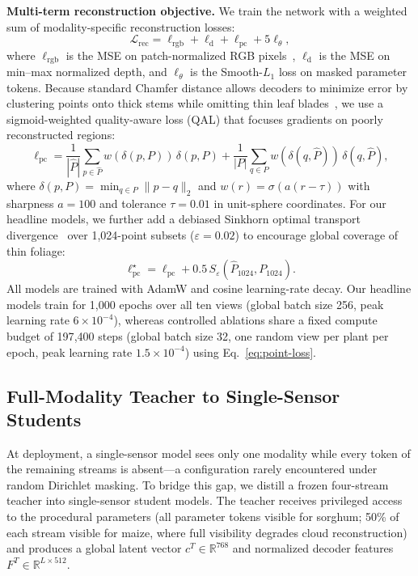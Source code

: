 \documentclass[10pt,twocolumn,letterpaper]{article}
\providecommand{\R}{\mathbb{R}}
\begin{document}
\noindent\textbf{Multi-term reconstruction objective.}
We train the network with a weighted sum of modality-specific reconstruction losses:
\begin{equation}
  \mathcal{L}_{\mathrm{rec}} = \ell_{\mathrm{rgb}} + \ell_{\mathrm{d}} + \ell_{\mathrm{pc}} + 5\ell_\theta,
  \label{eq:reconstruction-loss}
\end{equation}
where $\ell_{\mathrm{rgb}}$ is the MSE on patch-normalized RGB pixels~\citep{he2022mae}, $\ell_{\mathrm{d}}$ is the MSE on min--max normalized depth, and $\ell_\theta$ is the Smooth-$L_1$ loss on masked parameter tokens. Because standard Chamfer distance allows decoders to minimize error by clustering points onto thick stems while omitting thin leaf blades~\citep{wu2021dcd,song2026structural}, we use a sigmoid-weighted quality-aware loss (QAL) that focuses gradients on poorly reconstructed regions:
\begin{equation}
  \ell_{\mathrm{pc}} = \frac{1}{|\hat P|}\sum_{p\in\hat P}w(\delta(p,P))\,\delta(p,P) + \frac{1}{|P|}\sum_{q\in P}w(\delta(q,\hat P))\,\delta(q,\hat P),
  \label{eq:point-loss}
\end{equation}
where $\delta(p,P) = \min_{q \in P} \|p - q\|_2$ and $w(r) = \sigma(a(r - \tau))$ with sharpness $a = 100$ and tolerance $\tau = 0.01$ in unit-sphere coordinates. For our headline models, we further add a debiased Sinkhorn optimal transport divergence~\citep{feydy2019sinkhorn} over 1{,}024-point subsets ($\varepsilon = 0.02$) to encourage global coverage of thin foliage:
\begin{equation}
  \ell_{\mathrm{pc}}^{\star} = \ell_{\mathrm{pc}} + 0.5\,S_{\varepsilon}\!\left(\hat P_{1024}, P_{1024}\right).
  \label{eq:point-loss-sinkhorn}
\end{equation}
All models are trained with AdamW and cosine learning-rate decay. Our headline models train for 1{,}000 epochs over all ten views (global batch size 256, peak learning rate $6 \times 10^{-4}$), whereas controlled ablations share a fixed compute budget of 197{,}400 steps (global batch size 32, one random view per plant per epoch, peak learning rate $1.5 \times 10^{-4}$) using Eq.~\eqref{eq:point-loss}.

\subsection{Full-Modality Teacher to Single-Sensor Students}
\label{sec:distill}\label{sec:method-distill}

At deployment, a single-sensor model sees only one modality while every token of the remaining streams is absent---a configuration rarely encountered under random Dirichlet masking. To bridge this gap, we distill a frozen four-stream teacher into single-sensor student models. The teacher receives privileged access to the procedural parameters (all parameter tokens visible for sorghum; 50\% of each stream visible for maize, where full visibility degrades cloud reconstruction) and produces a global latent vector $c^T \in \R^{768}$ and normalized decoder features $F^T \in \R^{L \times 512}$.
\end{document}
